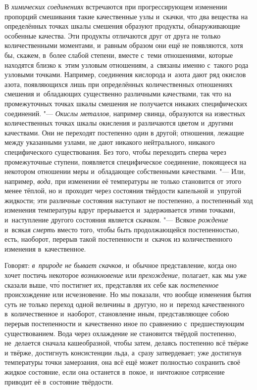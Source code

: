 В {\em химических соединениях} встречаются при прогрессирующем изменении
пропорций смешивания такие качественные узлы и~скачки, что два вещества на
определённых точках шкалы смешения образуют продукты, обнаруживающие особенные
качества. Эти продукты отличаются друг от друга не только количественными
моментами, и~равным образом они ещё не появляются, хотя бы, скажем, в~более
слабой степени, вместе с~теми отношениями, которые находятся близко к~этим
узловым отношениям, а~связаны именно с~такого рода узловыми точками. Например,
соединения кислорода и~азота дают ряд окислов азота, появляющихся лишь при
определённых количественных отношениях смешения и~обладающих существенно
различными качествами, так что на промежуточных точках шкалы смешения не
получается никаких специфических соединений. "--- {\em Окислы металлов,}
например свинца, образуются на известных количественных точках шкалы окисления
и различаются цветом и~другими качествами. Они не переходят постепенно один в
другой; отношения, лежащие между указанными узлами, не дают никакого
нейтрального, никакого специфического существования. Без того, чтобы переходить
сперва через промежуточные ступени, появляется специфическое соединение,
покоящееся на некотором отношении меры и~обладающее собственными качествами.
"--- Или, например, {\em вода,} при изменении её температуры не только
становится от этого менее тёплой, но и~проходит через состояния твёрдости
капельной и~упругой жидкости; эти различные состояния наступают не постепенно,
а постепенный ход изменения температуры вдруг прерывается и~задерживается этими
точками, и~наступление другого состояния является скачком. "--- Всякое
{\em рождение} и~всякая {\em смерть} вместо того, чтобы быть продолжающейся
постепенностью, есть, наоборот, перерыв такой постепенности и~скачок из
количественного изменения в~качественное.

Говорят: {\em в~природе не бывает скачков,} и~обычное представление, когда оно
хочет постичь некоторое {\em возникновение} или {\em прехождение,} полагает,
как мы уже сказали выше, чт\'{о} постигнет их, представляя их себе как
{\em постепенное} происхождение или исчезновение. Но мы показали, что вообще
изменения бытия суть не только переход одной величины в~другую, но и~переход
качественного в~количественное и~наоборот, становление иным, представляющее
собою перерыв постепенности и~качественно иное по сравнению с~предшествующим
существованием. Вода через охлаждение не становится твёрдой постепенно,
не~делается сначала кашеобразной, чтобы затем, делаясь постепенно всё твёрже и
твёрже, достигнуть консистенции льда, а~сразу затвердевает; уже достигнув
температуры точки замерзания, она всё ещё может полностью сохранить своё жидкое
состояние, если она останется в~покое, и~ничтожное сотрясение приводит её
в~состояние твёрдости.

